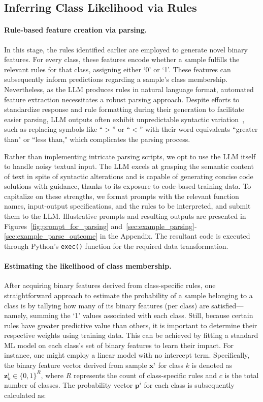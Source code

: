 \subsection{Inferring Class Likelihood via Rules}
\label{Sec:training}

\paragraph{Rule-based feature creation via parsing.} In this stage, the rules identified earlier are employed to generate novel binary features. For every class, these features encode whether a sample fulfills the relevant rules for that class, assigning either ‘0’ or ‘1’. These features can subsequently inform predictions regarding a sample’s class membership. Nevertheless, as the LLM produces rules in natural language format, automated feature extraction necessitates a robust parsing approach. Despite efforts to standardize response and rule formatting during their generation to facilitate easier parsing, LLM outputs often exhibit unpredictable syntactic variation~\cite{kovavc2023large}, such as replacing symbols like ``$>$” or ``$<$” with their word equivalents ``greater than" or ``less than," which complicates the parsing process.

Rather than implementing intricate parsing scripts, we opt to use the LLM itself to handle noisy textual input. The LLM excels at grasping the semantic content of text in spite of syntactic alterations and is capable of generating concise code solutions with guidance, thanks to its exposure to code-based training data. To capitalize on these strengths, we format prompts with the relevant function names, input-output specifications, and the rules to be interpreted, and submit them to the LLM. Illustrative prompts and resulting outputs are presented in Figures~\ref{fig:prompt_for_parsing} and~\ref{sec:example_parsing}-\ref{sec:example_parse_outcome} in the Appendix. The resultant code is executed through Python’s \texttt{exec()} function for the required data transformation.

\vspace*{-0.12in}
\paragraph{Estimating the likelihood of class membership.} After acquiring binary features derived from class-specific rules, one straightforward approach to estimate the probability of a sample belonging to a class is by tallying how many of its binary features (per class) are satisfied—namely, summing the ‘1’ values associated with each class. Still, because certain rules have greater predictive value than others, it is important to determine their respective weights using training data. This can be achieved by fitting a standard ML model on each class’s set of binary features to learn their impact. For instance, one might employ a linear model with no intercept term. Specifically, the binary feature vector derived from sample $\mathbf{x}^i$ for class $k$ is denoted as $\mathbf{z}_k^i \in \{0, 1\}^R$, where $R$ represents the count of class-specific rules and $c$ is the total number of classes. The probability vector $\mathbf{p}^i$ for each class is subsequently calculated as:

